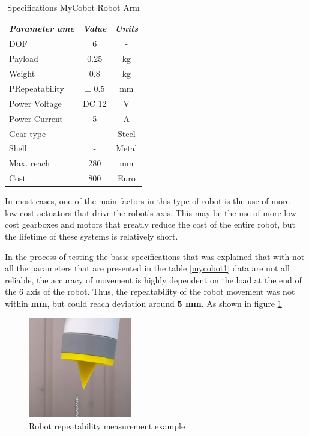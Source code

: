 \begin{table}[H]
    \caption{Specifications MyCobot Robot Arm}\label{tab:mycobot1}
    \centering
    \begin{tabular}{|l|c|c|}
        \hline
        \textit{\textbf{Parameter ame}} & \multicolumn{1}{l|}{\textit{\textbf{Value}}} & \multicolumn{1}{l|}{\textit{\textbf{Units}}} \\ \hline
        DOF                  & 6     & -     \\ \hline
        Payload              & 0.25  & kg    \\ \hline
        Weight               & 0.8   & kg    \\ \hline
        PRepeatability       & ± 0.5 & mm    \\ \hline
        Power Voltage        & DC 12 & V     \\ \hline
        Power Current        & 5     & A     \\ \hline
        Gear type            & -     & Steel \\ \hline
        Shell                & -     & Metal \\ \hline
        Max. reach           & 280     & mm \\ \hline
        Cost                 & 800    & Euro \\ \hline
        \end{tabular}
 \end{table}

 


 In most cases, one of the main factors in this type of robot is the use of more low-cost actuators that drive the robot's axis. This may be the use of more low-cost gearboxes and motors that greatly reduce the cost of the entire robot, but the lifetime of these systems is relatively short.

 In the process of testing the basic specifications that was explained that with not all the parameters that are presented in the table \ref{mycobot1} data are not all reliable, the accuracy of movement is highly dependent on the load at the end of the 6 axis of the robot. Thus, the repeatability of the robot movement was not within \textbf{ mm}, but could reach deviation around \textbf{ 5 mm}. As shown in figure \ref{mycobot2} 

 \begin{figure}[H]
	\centering
	\includegraphics[width=0.4\textwidth]{Src/images/mycobot2.png}
	\caption{Robot repeatability measurement example}
    \label{mycobot2}
\end{figure}

